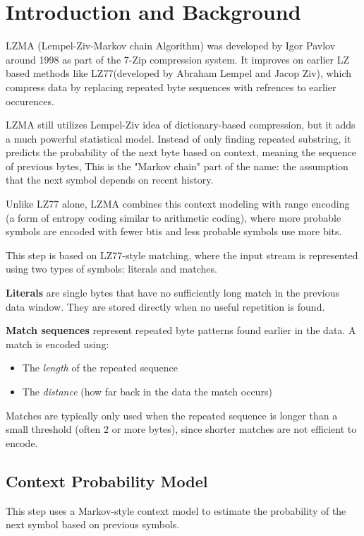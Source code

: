 \section{Introduction and Background}
LZMA (Lempel-Ziv-Markov chain Algorithm) was developed by Igor Pavlov around 1998 as part of the 7-Zip compression system. It improves on earlier LZ based methods like LZ77(developed by Abraham Lempel and Jacop Ziv), which compress data by replacing repeated byte sequences with refrences to earlier occurences.

LZMA still utilizes Lempel-Ziv idea of dictionary-based compression, but it adds a much powerful statistical model. Instead of only finding repeated substring, it predicts the probability of the next byte based on context, meaning the sequence of previous bytes, This is the "Markov chain" part of the name: the assumption that the next symbol depends on recent history.

Unlike LZ77 alone, LZMA combines this context modeling with range encoding (a form of entropy coding similar to arithmetic coding), where more probable symbols are encoded with fewer btis and less probable symbols use more bits.

This step is based on LZ77-style matching, where the input stream is represented using two types of symbols: literals and matches.

\textbf{Literals} are single bytes that have no sufficiently long match in the previous data window. They are stored directly when no useful repetition is found.

\textbf{Match sequences} represent repeated byte patterns found earlier in the data. A match is encoded using:
\begin{itemize}
  \item The \textit{length} of the repeated sequence
  \item The \textit{distance} (how far back in the data the match occurs)
\end{itemize}

Matches are typically only used when the repeated sequence is longer than a small threshold (often 2 or more bytes), since shorter matches are not efficient to encode.

\subsection{Context Probability Model}

This step uses a Markov-style context model to estimate the probability of the next symbol based on previous symbols.

